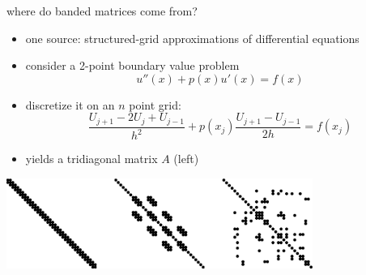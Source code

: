 \documentclass[10pt,
               svgnames,
               hyperref={colorlinks,citecolor=DeepPink4,linkcolor=FireBrick,urlcolor=Maroon},
               usepdftitle=false]{beamer}
\begin{document}
\begin{frame}{where do banded matrices come from?}

\begin{itemize}
\item one source: structured-grid approximations of differential equations
\item consider a 2-point boundary value problem
    $$u''(x) + p(x) u'(x) = f(x)$$
\item discretize it on an $n$ point grid:
    $$\frac{U_{j+1} - 2 U_j + U_{j-1}}{h^2} + p(x_j) \frac{U_{j+1} - U_{j-1}}{2 h} = f(x_j)$$
\item yields a tridiagonal matrix $A$ (left)
\end{itemize}

\begin{center}
\includegraphics[width=0.75\textwidth]{images/spythree.png}
\end{center}
\end{frame}
\end{document}

